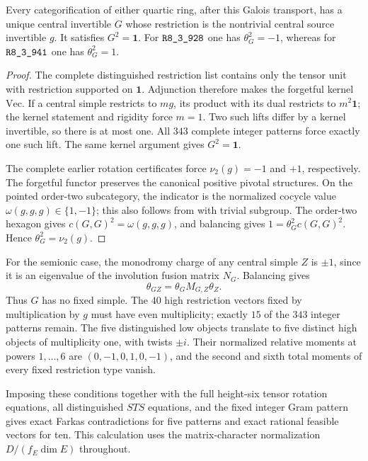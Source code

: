 \begin{proposition}
\label{prop:frontier-forced-quartic-involution}
Every categorification of either quartic ring, after this Galois transport,
has a unique central invertible $G$ whose restriction is the nontrivial
central source invertible $g$. It satisfies $G^2=\mathbf1$. For
$\sha{R8_3_928}$ one has $\theta_G^2=-1$, whereas for $\sha{R8_3_941}$ one has
$\theta_G^2=1$.
\end{proposition}
\begin{proof}
The complete distinguished restriction list contains only the tensor unit
with restriction supported on $\mathbf1$. Adjunction therefore makes the
forgetful kernel $\mathrm{Vec}$. If a central simple restricts to $m g$,
its product with its dual restricts to $m^2\mathbf1$; the kernel statement
and rigidity force $m=1$. Two such lifts differ by a kernel invertible,
so there is at most one. All $343$ complete integer patterns force exactly
one such lift. The same kernel argument gives $G^2=\mathbf1$.

The complete earlier rotation certificates force
$\nu_2(g)=-1$ and $+1$, respectively. The forgetful functor preserves the
canonical positive pivotal structures. On the pointed order-two
subcategory, the indicator is the normalized cocycle value
$\omega(g,g,g)\in\{1,-1\}$; this also follows from
\cite[Definition~2.2 and Proposition~4.1]{SchauenburgPointedFrontier}
with trivial subgroup. The order-two hexagon gives
$c(G,G)^2=\omega(g,g,g)$, and balancing gives
$1=\theta_G^2c(G,G)^2$. Hence $\theta_G^2=\nu_2(g)$.
\end{proof}

For the semionic case, the monodromy charge of any central simple $Z$
is $\pm1$, since it is an eigenvalue of the involution fusion matrix
$N_G$. Balancing gives
\[
 \theta_{GZ}=\theta_G M_{G,Z}\theta_Z.
\]
Thus $G$ has no fixed simple. The $40$ high restriction vectors fixed by
multiplication by $g$ must have even multiplicity; exactly $15$ of the
$343$ integer patterns remain. The five distinguished low objects
translate to five distinct high objects of multiplicity one, with twists
$\pm i$. Their normalized relative moments at powers $1,\ldots,6$ are
$(0,-1,0,1,0,-1)$, and the second and sixth total moments of every fixed
restriction type vanish.

Imposing these conditions together with the full height-six tensor
rotation equations, all distinguished $STS$ equations, and the fixed
integer Gram pattern gives exact Farkas contradictions for five patterns
and exact rational feasible vectors for ten. This calculation uses the
matrix-character normalization $D/(f_E\dim E)$ throughout.

